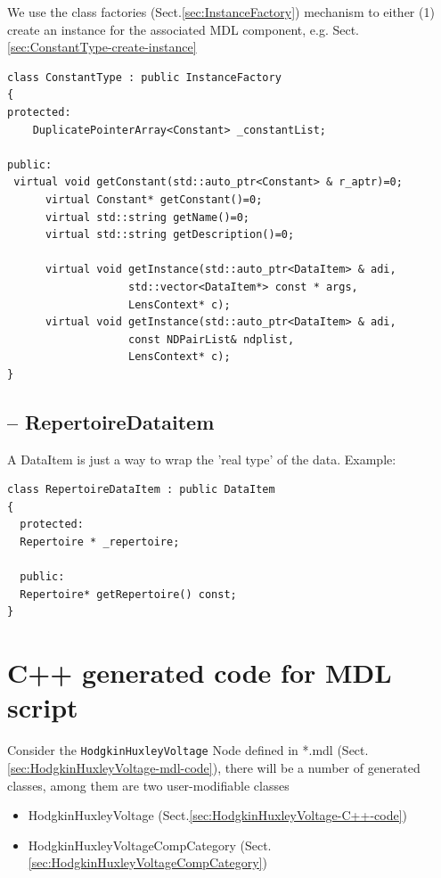 We use the class factories (Sect.\ref{sec:InstanceFactory}) mechanism to either
(1) create an instance for the associated MDL component, e.g.
Sect.\ref{sec:ConstantType-create-instance}

\begin{verbatim}
class ConstantType : public InstanceFactory
{
protected:
    DuplicatePointerArray<Constant> _constantList;

public:
 virtual void getConstant(std::auto_ptr<Constant> & r_aptr)=0;
      virtual Constant* getConstant()=0;
      virtual std::string getName()=0;
      virtual std::string getDescription()=0;
      
      virtual void getInstance(std::auto_ptr<DataItem> & adi, 
			       std::vector<DataItem*> const * args, 
			       LensContext* c);
      virtual void getInstance(std::auto_ptr<DataItem> & adi, 
			       const NDPairList& ndplist,
			       LensContext* c);      
}
\end{verbatim}


\subsection{-- RepertoireDataitem}
\label{sec:RepertoireDataitem}

A DataItem is just a way to wrap the 'real type' of the data. Example:
\begin{verbatim}
class RepertoireDataItem : public DataItem
{
  protected:
  Repertoire * _repertoire;
  
  public:
  Repertoire* getRepertoire() const;  
}
\end{verbatim}

\section{C++ generated code for MDL script}
\label{sec:MDL-generated-classes}

Consider the \verb!HodgkinHuxleyVoltage! Node defined in *.mdl
(Sect.\ref{sec:HodgkinHuxleyVoltage-mdl-code}), there will be a number of
generated classes, among them are two user-modifiable classes
\begin{itemize}
  \item HodgkinHuxleyVoltage (Sect.\ref{sec:HodgkinHuxleyVoltage-C++-code})
  \item HodgkinHuxleyVoltageCompCategory
  (Sect.\ref{sec:HodgkinHuxleyVoltageCompCategory})
\end{itemize}

